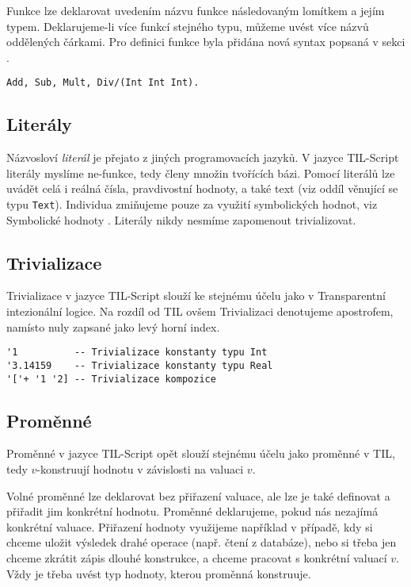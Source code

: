 Funkce lze deklarovat uvedením názvu funkce následovaným lomítkem a jejím typem. Deklarujeme-li
více funkcí stejného typu, můžeme uvést více názvů oddělených čárkami. Pro definici funkce byla
přidána nová syntax popsaná v sekci .

\begin{lstlisting}[caption={Deklarace funkcí}]
Add, Sub, Mult, Div/(Int Int Int).
\end{lstlisting}

\subsection{Literály}

Názvosloví \textit{literál} je přejato z jiných programovacích jazyků. V jazyce TIL-Script literály
myslíme ne-funkce, tedy členy množin tvořících bázi. Pomocí literálů lze uvádět celá i reálná
čísla, pravdivostní hodnoty, a také text (viz oddíl  věnující se typu
\lstinline{Text}). Individua zmiňujeme pouze za využití symbolických hodnot, viz Symbolické hodnoty
. Literály nikdy nesmíme zapomenout trivializovat.

\subsection{Trivializace}

Trivializace v jazyce TIL-Script slouží ke stejnému účelu jako v Transparentní intezionální logice.
Na rozdíl od TIL ovšem Trivializaci denotujeme apostrofem, namísto nuly zapsané jako levý horní
index.

\begin{lstlisting}[caption={Příklad Trivializace.}]
'1          -- Trivializace konstanty typu Int
'3.14159    -- Trivializace konstanty typu Real
'['+ '1 '2] -- Trivializace kompozice
\end{lstlisting}

\subsection{Proměnné}

Proměnné v jazyce TIL-Script opět slouží stejnému účelu jako proměnné v TIL, tedy $v$-konstruují
hodnotu v závislosti na valuaci $v$.

Volné proměnné lze deklarovat bez přiřazení valuace, ale lze je také definovat a přiřadit jim
konkrétní hodnotu. Proměnné deklarujeme, pokud nás nezajímá konkrétní valuace. Přiřazení hodnoty
využijeme například v případě, kdy si chceme uložit výsledek drahé operace (např. čtení
z databáze), nebo si třeba jen chceme zkrátit zápis dlouhé konstrukce, a chceme pracovat
s konkrétní valuací $v$. Vždy je třeba uvést typ hodnoty, kterou proměnná konstruuje.

